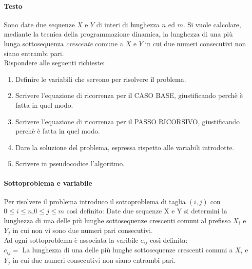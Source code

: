 \documentclass[12pt, a4paper, openany]{book}
\begin{document}
\paragraph{Testo}
Sono date due sequenze $X$ e $Y$ di interi di lunghezza $n$ ed $m$.
Si vuole calcolare, mediante la tecnica della programmazione dinamica, la lunghezza di una più lunga sottosequenza \emph{crescente} comune a $X$ e $Y$ in cui due numeri consecutivi non siano entrambi pari.
\\Rispondere alle seguenti richieste:
\begin{enumerate}
	\item Definire le variabili che servono per risolvere il problema.
	\item Scrivere l'equazione di ricorrenza per il CASO BASE, giustificando perchè è fatta in quel modo.
	\item Scrivere l'equazione di ricorrenza per il PASSO RICORSIVO, giustificando perchè è fatta in quel modo.
	\item Dare la soluzione del problema, espressa rispetto alle variabili introdotte.
	\item Scrivere in pseudocodice l'algoritmo.
\end{enumerate}

\paragraph*{Sottoproblema e variabile}
Per risolvere il problema introduco il sottoproblema di taglia $(i,j)$ con $0\leq i \leq n$,$0\leq j \leq m$ così definito:
Date due sequenze X e Y si determini la lunghezza di una delle più lunghe sottosequenze crescenti comuni al prefisso $X_i$ e $Y_j$ in cui non vi sono due
numeri pari consecutivi.
\\Ad ogni sottoproblema è associata la varibile $c_{ij}$ così definita:
\\$c_{ij}=$ La lunghezza di una delle più lunghe sottosequenze crescenti comuni a $X_i$ e $Y_j$ in cui due numeri consecutivi non siano entrambi pari.
\end{document}
